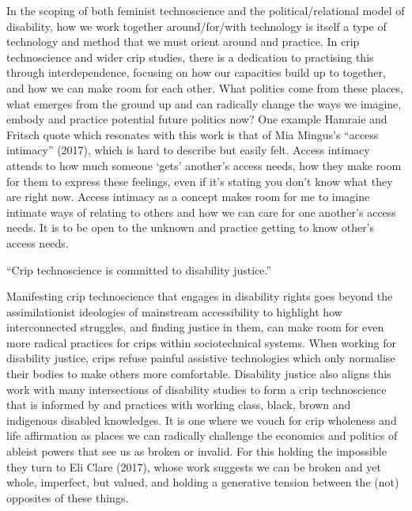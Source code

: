 In the scoping of both feminist technoscience and the
political/relational model of disability, how we work together
around/for/with technology is itself a type of technology and method
that we must orient around and practice. In crip technoscience and wider
crip studies, there is a dedication to practising this through
interdependence, focusing on how our capacities build up to together,
and how we can make room for each other. What politics come from these
places, what emerges from the ground up and can radically change the
ways we imagine, embody and practice potential future politics now? One
example Hamraie and Fritsch quote which resonates with this work is that
of Mia Mingus's ``access intimacy'' (2017), which is hard to describe
but easily felt. Access intimacy attends to how much someone `gets'
another's access needs, how they make room for them to express these
feelings, even if it's stating you don't know what they are right now.
Access intimacy as a concept makes room for me to imagine intimate ways
of relating to others and how we can care for one another's access
needs. It is to be open to the unknown and practice getting to know
other's access needs.

``Crip technoscience is committed to disability justice.''

Manifesting crip technoscience that engages in disability rights goes
beyond the assimilationist ideologies of mainstream accessibility to
highlight how interconnected struggles, and finding justice in them, can
make room for even more radical practices for crips within
sociotechnical systems. When working for disability justice, crips
refuse painful assistive technologies which only normalise their bodies
to make others more comfortable. Disability justice also aligns this
work with many intersections of disability studies to form a crip
technoscience that is informed by and practices with working class,
black, brown and indigenous disabled knowledges. It is one where we
vouch for crip wholeness and life affirmation as places we can radically
challenge the economics and politics of ableist powers that see us as
broken or invalid. For this holding the impossible they turn to Eli
Clare (2017), whose work suggests we can be broken and yet whole,
imperfect, but valued, and holding a generative tension between the
(not) opposites of these things.

